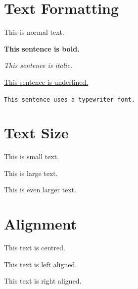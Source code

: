 \documentclass{article}
\begin{document}
\section{Text Formatting}

This is normal text.

\textbf{This sentence is bold.}

\textit{This sentence is italic.}

\underline{This sentence is underlined.}

\texttt{This sentence uses a typewriter font.}

\section{Text Size}

{\small This is small text.}

{\large This is large text.}

{\Large This is even larger text.}

\section{Alignment}

\begin{center}
This text is centred.
\end{center}

\begin{flushleft}
This text is left aligned.
\end{flushleft}

\begin{flushright}
This text is right aligned.
\end{flushright}
\end{document}

